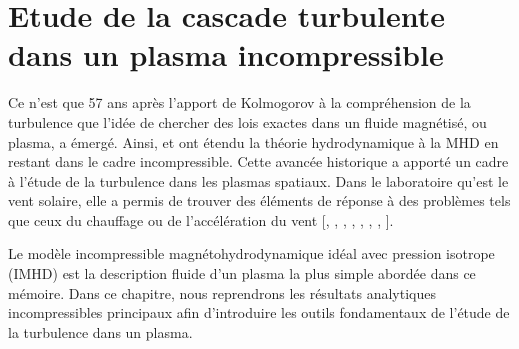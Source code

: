 \chapter{Etude de la cascade turbulente dans un plasma incompressible}
\renewcommand\partie{\Partie\ Chapitre \thechapter}
\label{ch-11}

\minitoc  

\bigskip

Ce n'est que 57 ans après l'apport de Kolmogorov à la compréhension de la turbulence que l'idée de chercher des lois exactes dans un fluide magnétisé, ou plasma, a émergé. Ainsi, \cite{politano_von_1998} et \cite{politano_dynamical_1998} ont étendu la théorie hydrodynamique à la \ac{MHD} en restant dans le cadre incompressible. Cette avancée historique a apporté un cadre à l'étude de la turbulence dans les plasmas spatiaux. Dans le laboratoire qu'est le vent solaire, elle a permis de trouver des éléments de réponse à des problèmes tels que ceux du chauffage ou de l'accélération du vent [\cite{smith_dependence_2006}, \cite{sorriso-valvo_observation_2007}, \cite{stawarz_turbulent_2009}, \cite{osman_proton_2013}, \cite{bruno_solar_2013}, \cite{alexandrova_solar_2013}, \cite{sahraoui_magnetohydrodynamic_2020}, \cite{marino_scaling_2023}]. 

Le modèle incompressible magnétohydrodynamique idéal avec pression isotrope (\acs{IMHD}) est la description fluide d'un plasma la plus simple abordée dans ce mémoire. Dans ce chapitre, nous reprendrons les résultats analytiques incompressibles principaux afin d'introduire les outils fondamentaux de l'étude de la turbulence dans un plasma.

